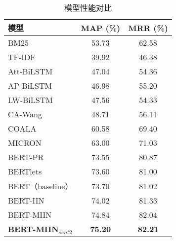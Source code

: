 \begin{table}
    \caption{模型性能对比}
    \centering
    \newcommand{\tabincell}[2]{\begin{tabular}{@{}#1@{}}#2\end{tabular}}
    \begin{tabular}{l|c|c}
    \toprule[0.7pt]
    \textbf{模型\qquad\qquad\qquad\qquad\ } & \textbf{\enspace MAP (\%)\enspace} & \textbf{\enspace MRR (\%)\enspace  } \\
    \midrule[0.7pt]

    BM25 & 53.73 & 62.58 \\
    TF-IDF & 39.92 & 46.38 \\
    \midrule[0.4pt]
    Att-BiLSTM & 47.04 & 54.36 \\
    AP-BiLSTM & 46.98 & 55.20 \\
    LW-BiLSTM & 47.56 & 54.33 \\
    CA-Wang & 48.71 & 56.11 \\
    COALA & 60.58 & 69.40 \\
    MICRON & 63.00 & 71.03 \\
    BERT-PR & 73.55 & 80.87 \\
    BERTlets & 73.60 & 81.00 \\
    \midrule[0.4pt]
    BERT（baseline） & 73.70 & 81.02 \\
    BERT-IIN & 74.02 & 81.33 \\
    BERT-MIIN & 74.84 & 82.04 \\
    \textbf{BERT-MIIN$_{sent2}$} & \textbf{75.20} & \textbf{82.21} \\
    \bottomrule[0.7pt]
    \end{tabular}
    \label{table3-2}
\end{table}